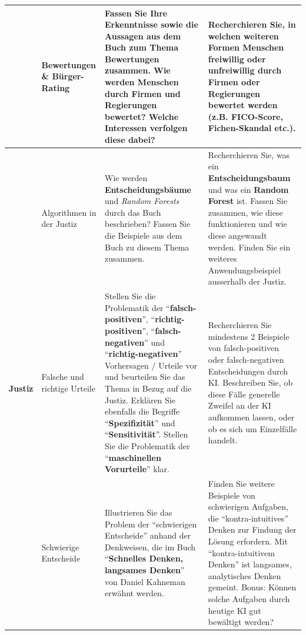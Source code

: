 \begin{landscape}
\begin{longtable}{@{}rp{5.3cm}p{9.5cm}p{9.5cm}@{}}
		                              & Bewertungen \& Bürger-Rating          & Fassen Sie Ihre Erkenntnisse sowie die Aussagen aus dem Buch zum Thema \textbf{Bewertungen} zusammen. Wie werden \textbf{Menschen durch Firmen und Regierungen bewertet}? Welche Interessen verfolgen diese dabei?                                                                                                                                                                            & Recherchieren Sie, in welchen weiteren Formen Menschen freiwillig oder unfreiwillig durch Firmen oder Regierungen bewertet werden (z.B. FICO-Score, Fichen-Skandal etc.).                                                                                                        \\\midrule
		\multirow{4}{*}{\textbf{Justiz}}       & Algorithmen in der Justiz             & Wie werden \textbf{Entscheidungsbäume} und \textit{Random Forests} durch das Buch beschrieben? Fassen Sie die Beispiele aus dem Buch zu diesem Thema zusammen.                                                                                                                                                                                                                       & Recherchieren Sie, was ein \textbf{Entscheidungsbaum} und was ein \textbf{Random Forest} ist. Fassen Sie zusammen, wie diese funktionieren und wie diese angewandt werden. Finden Sie ein weiteres Anwendungsbeispiel ausserhalb der Justiz.                                                       \\\cmidrule(l){2-4}
		                              & Falsche und richtige Urteile          & Stellen Sie die Problematik der \enquote{\textbf{falsch-positiven}}, \enquote{\textbf{richtig-positiven}}, \enquote{\textbf{falsch-negativen}} und \enquote{\textbf{richtig-negativen}} Vorhersagen / Urteile vor und beurteilen Sie das Thema in Bezug auf die Justiz. Erklären Sie ebenfalls die Begriffe \enquote{\textbf{Spezifizität}} und \enquote{\textbf{Sensitivität}}. Stellen Sie die Problematik der \enquote{\textbf{maschinellen Vorurteile}} klar.                    & Recherchieren Sie mindestens 2 Beispiele von falsch-positiven oder falsch-negativen Entscheidungen durch KI. Beschreiben Sie, ob diese Fälle generelle Zweifel an der KI aufkommen lassen, oder ob es sich um Einzelfälle handelt.                                           \\\cmidrule(l){2-4}
		                              & Schwierige Entscheide                 & Illustrieren Sie das Problem der \enquote{schwierigen Entscheide} anhand der Denkweisen, die im Buch \enquote{\textbf{Schnelles Denken, langsames Denken}} von Daniel Kahneman erwähnt werden.                                                                                                                        & Finden Sie weitere Beispiele von schwierigen Aufgaben, die \enquote{kontra-intuitives} Denken zur Findung der Lösung erfordern. Mit \enquote{kontra-intuitivem Denken} ist langsames, analytisches Denken gemeint. Bonus: Können solche Aufgaben durch heutige KI gut bewältigt werden?      \\\midrule

\end{longtable}
\end{landscape}

